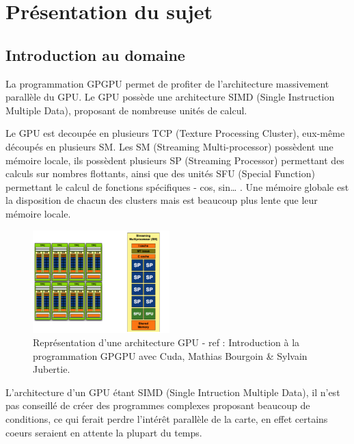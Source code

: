 \documentclass{report}
\begin{document}
\chapter{Présentation du sujet}

\section{Introduction au domaine}
La programmation GPGPU permet de profiter de l’architecture massivement parallèle du GPU. Le GPU possède une architecture SIMD (Single Instruction Multiple Data), proposant de nombreuse unités de calcul.\newline

Le GPU est decoupée en plusieurs TCP (Texture Processing Cluster), eux-même découpés en plusieurs SM. Les SM (Streaming Multi-processor) possèdent une mémoire locale, ils possèdent plusieurs SP (Streaming Processor) permettant des calculs sur nombres flottants, ainsi que des unités SFU (Special Function) permettant le calcul de fonctions spécifiques - cos, sin… . Une mémoire globale est la disposition de chacun des clusters mais est beaucoup plus lente que leur mémoire locale.

\begin{figure}[!h]
\begin{center}
\includegraphics[height=150]{image2.png}
\end{center}
\caption{Représentation d’une architecture GPU - ref : Introduction à la programmation GPGPU avec Cuda, Mathias Bourgoin & Sylvain Jubertie.}
\label{test}
\end{figure} \newline

L’architecture d’un GPU étant SIMD (Single Intruction Multiple Data), il n’est pas conseillé de créer des programmes complexes proposant beaucoup de conditions, ce qui ferait perdre l'intérêt parallèle de la carte, en effet certains coeurs seraient en attente la plupart du temps. 
\end{document}
